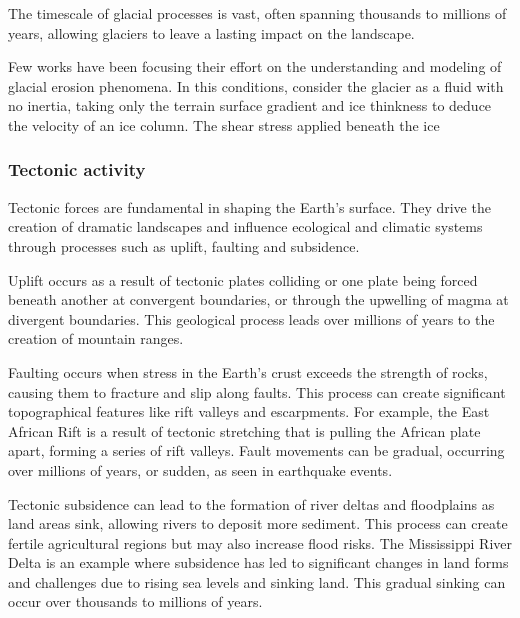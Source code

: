 The timescale of glacial processes is vast, often spanning thousands to millions of years, allowing glaciers to leave a lasting impact on the landscape.

Few works have been focusing their effort on the understanding and modeling of glacial erosion phenomena. In this conditions, \cite{Argudo2020} consider the glacier as a fluid with no inertia, taking only the terrain surface gradient and ice thinkness to deduce the velocity of an ice column. The shear stress applied beneath the ice 

\subsubsection{Tectonic activity}
Tectonic forces are fundamental in shaping the Earth's surface. They drive the creation of dramatic landscapes and influence ecological and climatic systems through processes such as uplift, faulting and subsidence.

Uplift occurs as a result of tectonic plates colliding or one plate being forced beneath another at convergent boundaries, or through the upwelling of magma at divergent boundaries. This geological process leads over millions of years to the creation of mountain ranges.

Faulting occurs when stress in the Earth's crust exceeds the strength of rocks, causing them to fracture and slip along faults. This process can create significant topographical features like rift valleys and escarpments. For example, the East African Rift is a result of tectonic stretching that is pulling the African plate apart, forming a series of rift valleys. Fault movements can be gradual, occurring over millions of years, or sudden, as seen in earthquake events.


Tectonic subsidence can lead to the formation of river deltas and floodplains as land areas sink, allowing rivers to deposit more sediment. This process can create fertile agricultural regions but may also increase flood risks. The Mississippi River Delta is an example where subsidence has led to significant changes in land forms and challenges due to rising sea levels and sinking land. This gradual sinking can occur over thousands to millions of years.


